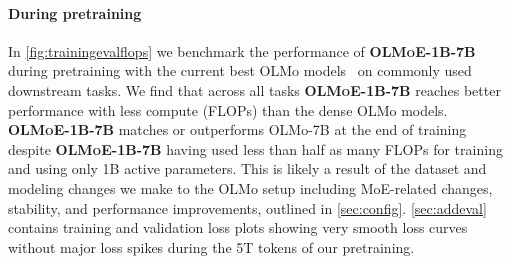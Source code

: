 \documentclass{article}
\newcommand{\modelsmall}{\textbf{\textsc{OLMoE-1B-7B}}}
\begin{document}
\paragraph{During pretraining} In \autoref{fig:trainingevalflops} we benchmark the performance of \modelsmall{} during pretraining with the current best OLMo models~\citep{groeneveld2024olmo} on commonly used downstream tasks. We find that across all tasks \modelsmall{} reaches better performance with less compute (FLOPs) than the dense OLMo models. \modelsmall{} matches or outperforms OLMo-7B at the end of training despite \modelsmall{} having used less than half as many FLOPs for training and using only 1B active parameters. This is likely a result of the dataset and modeling changes we make to the OLMo setup including MoE-related changes, stability, and performance improvements, outlined in \autoref{sec:config}. \autoref{sec:addeval} contains training and validation loss plots showing very smooth loss curves without major loss spikes during the 5T tokens of our pretraining. 
\end{document}
